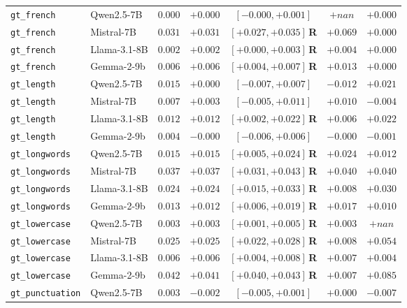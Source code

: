 \begin{table}[htbp]
\begin{tabular}{llccccc}
    \texttt{gt\_french} & Qwen2.5-7B & $0.000$ & $+0.000$ & $[-0.000, +0.001]$ & $+nan$ & $+0.000$ \\
    \texttt{gt\_french} & Mistral-7B & $0.031$ & $+0.031$ & $[+0.027, +0.035]$\,\textbf{R} & $+0.069$ & $+0.000$ \\
    \texttt{gt\_french} & Llama-3.1-8B & $0.002$ & $+0.002$ & $[+0.000, +0.003]$\,\textbf{R} & $+0.004$ & $+0.000$ \\
    \texttt{gt\_french} & Gemma-2-9b & $0.006$ & $+0.006$ & $[+0.004, +0.007]$\,\textbf{R} & $+0.013$ & $+0.000$ \\
    \texttt{gt\_length} & Qwen2.5-7B & $0.015$ & $+0.000$ & $[-0.007, +0.007]$ & $-0.012$ & $+0.021$ \\
    \texttt{gt\_length} & Mistral-7B & $0.007$ & $+0.003$ & $[-0.005, +0.011]$ & $+0.010$ & $-0.004$ \\
    \texttt{gt\_length} & Llama-3.1-8B & $0.012$ & $+0.012$ & $[+0.002, +0.022]$\,\textbf{R} & $+0.006$ & $+0.022$ \\
    \texttt{gt\_length} & Gemma-2-9b & $0.004$ & $-0.000$ & $[-0.006, +0.006]$ & $-0.000$ & $-0.001$ \\
    \texttt{gt\_longwords} & Qwen2.5-7B & $0.015$ & $+0.015$ & $[+0.005, +0.024]$\,\textbf{R} & $+0.024$ & $+0.012$ \\
    \texttt{gt\_longwords} & Mistral-7B & $0.037$ & $+0.037$ & $[+0.031, +0.043]$\,\textbf{R} & $+0.040$ & $+0.040$ \\
    \texttt{gt\_longwords} & Llama-3.1-8B & $0.024$ & $+0.024$ & $[+0.015, +0.033]$\,\textbf{R} & $+0.008$ & $+0.030$ \\
    \texttt{gt\_longwords} & Gemma-2-9b & $0.013$ & $+0.012$ & $[+0.006, +0.019]$\,\textbf{R} & $+0.017$ & $+0.010$ \\
    \texttt{gt\_lowercase} & Qwen2.5-7B & $0.003$ & $+0.003$ & $[+0.001, +0.005]$\,\textbf{R} & $+0.003$ & $+nan$ \\
    \texttt{gt\_lowercase} & Mistral-7B & $0.025$ & $+0.025$ & $[+0.022, +0.028]$\,\textbf{R} & $+0.008$ & $+0.054$ \\
    \texttt{gt\_lowercase} & Llama-3.1-8B & $0.006$ & $+0.006$ & $[+0.004, +0.008]$\,\textbf{R} & $+0.007$ & $+0.004$ \\
    \texttt{gt\_lowercase} & Gemma-2-9b & $0.042$ & $+0.041$ & $[+0.040, +0.043]$\,\textbf{R} & $+0.007$ & $+0.085$ \\
    \texttt{gt\_punctuation} & Qwen2.5-7B & $0.003$ & $-0.002$ & $[-0.005, +0.001]$ & $+0.000$ & $-0.007$ \\

\end{tabular}
\end{table}
